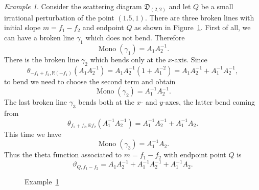 \documentclass[11pt]{amsart}
\theoremstyle{remark}
\newtheorem{example}[theorem]{Example}
\numberwithin{equation}{section}
\newcommand{\RR}{\mathbb{R}}
\newcommand{\DD}{\mathfrak{D}}
\newcommand{\Mono}{\operatorname{Mono}}
\begin{document}
\begin{example} 
  \label{brokenex}
  Consider the scattering diagram $\DD_{(2,2)}$ and let $Q$ be a small
  irrational perturbation of the point $(1.5,1)$. There are three broken lines
  with initial slope $m = f_1-f_2$ and endpoint $Q$ as shown in
  Figure~\ref{figbrokenex}.
  First of all, we can have a broken line $\gamma_1$ which does not bend.
  Therefore
  \[
    \Mono(\gamma_1) = A_1 A_2^{-1}.
  \]
  There is the broken line $\gamma_2$  which bends only at the $x$-axis. Since
  \[ 
    \theta_{-f_1+f_2, \RR(-f_1)} (A_1 A_2^{-1}) = 
    A_1 A_2^{-1}(1+A_1^{-2}) =  A_1 A_2^{-1} + A_1^{-1} A_2^{-1},
  \]
  to bend we need to choose the second term and obtain 
  \[
    \Mono(\gamma_2) =  A_1^{-1} A_2^{-1}.
  \]
  The last broken line $\gamma_3$ bends both at the $x$- and $y$-axes, the
  latter bend coming from
  \[ 
    \theta_{ f_1+f_2, \RR f_2} ( A_1^{-1} A_2^{-1}) =  
    A_1^{-1} A_2^{-1} + A_1^{-1} A_2.  
  \]
  This time we have 
  \[
    \Mono (\gamma_3) = A_1^{-1} A_2.
  \]
  Thus the theta function associated to $m = f_1-f_2$ with endpoint point $Q$ is 
  \[ 
    \vartheta_{Q, f_1-f_2} =  
    A_1 A_2^{-1} + A_1^{-1} A_2^{-1} +A_1^{-1} A_2 .  
  \]
\end{example}

\begin{figure}
  \centering
  \caption{Example~\ref{brokenex}} 
  \label{figbrokenex}
\end{figure}
\end{document}

